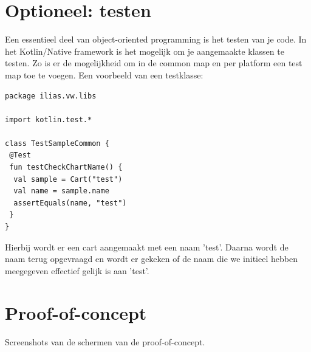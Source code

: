 \section{Optioneel: testen}
\label{sec:testing}
Een essentieel deel van object-oriented programming is het testen van je code. In het Kotlin/Native framework is het mogelijk om je aangemaakte klassen te testen. Zo is er de mogelijkheid om in de common map en per platform een test map toe te voegen. Een voorbeeld van een testklasse:

\begin{lstlisting}
package ilias.vw.libs

import kotlin.test.*

class TestSampleCommon {
 @Test
 fun testCheckChartName() {
  val sample = Cart("test")
  val name = sample.name
  assertEquals(name, "test")
 }
}

\end{lstlisting}

Hierbij wordt er een cart aangemaakt met een naam 'test'. Daarna wordt de naam terug opgevraagd en wordt er gekeken of de naam die we initieel hebben meegegeven effectief gelijk is aan 'test'.

\section{Proof-of-concept}
\label{sec:poc}
Screenshots van de schermen van de proof-of-concept.
